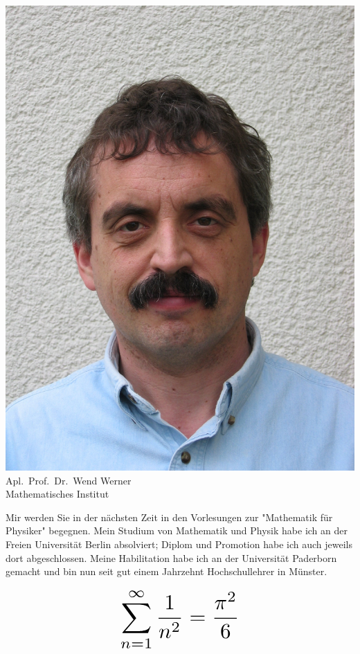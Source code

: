 \begin{multicols}{2}
\begin{center}
	\includegraphics[width=\columnwidth, height=0.35\textheight]{res/vorstellungsfotos/wend_werner.jpg}\\
\smallskip
	Apl.\ Prof.\ Dr.\ Wend Werner\\
	Mathematisches Institut
\end{center}

Mir werden Sie in der nächsten Zeit in den Vorlesungen zur "Mathematik für Physiker" begegnen.
Mein Studium von Mathematik und Physik habe ich an der Freien Universität Berlin absolviert; Diplom und Promotion habe ich auch jeweils dort abgeschlossen.
Meine Habilitation habe ich an der Universität Paderborn gemacht und bin nun seit gut einem Jahrzehnt Hochschullehrer in Münster.

\[
	\resizebox{0.4\columnwidth}{!}{
		$\displaystyle\sum_{n = 1}^\infty \frac{1}{n^2} = \frac{\pi^2}{6}$
	}
\]


\end{multicols}
